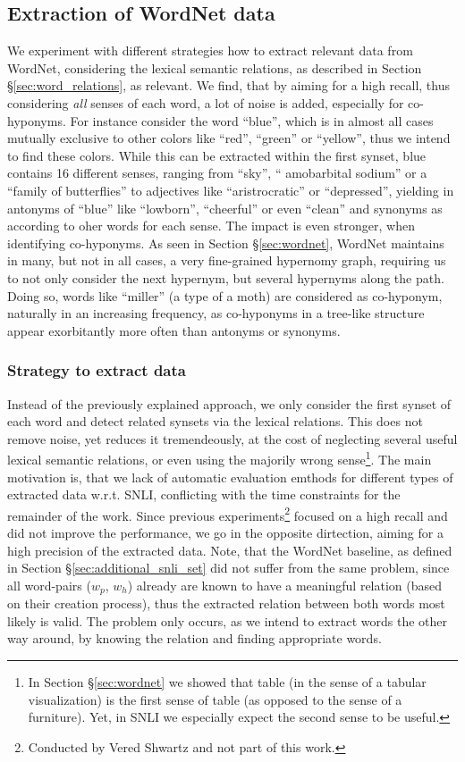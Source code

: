 \subsection{Extraction of WordNet data}
We experiment with different strategies how to extract relevant data from WordNet, considering the lexical semantic relations, as described in Section §\ref{sec:word_relations}, as relevant. We find, that by aiming for a high recall, thus considering \textit{all} senses of each word, a lot of noise is added, especially for co-hyponyms. For instance consider the word ``blue'', which is in almost all cases mutually exclusive to other colors like ``red'', ``green'' or ``yellow'', thus we intend to find these colors. While this can be extracted within the first synset, blue contains 16 different senses, ranging from ``sky'', `` amobarbital sodium'' or a ``family of butterflies'' to adjectives like ``aristrocratic'' or ``depressed'', yielding in antonyms of ``blue'' like  ``lowborn'', ``cheerful'' or even ``clean'' and synonyms as according to oher words for each sense. The impact is even stronger, when identifying co-hyponyms. As seen in Section §\ref{sec:wordnet}, WordNet maintains in many, but not in all cases, a very fine-grained hypernomy graph, requiring us to not only consider the next hypernym, but several hypernyms along the path. Doing so, words like ``miller'' (a type of a moth) are considered as co-hyponym, naturally in an increasing frequency, as co-hyponyms in a tree-like structure appear exorbitantly more often than antonyms or synonyms.

\subsubsection{Strategy to extract data}\label{sec:used_wordnet_extract_strategy}
Instead of the previously explained approach, we only consider the first synset of each word and detect related synsets via the lexical relations. This does not remove noise, yet reduces it tremendeously, at the cost of neglecting several useful lexical semantic relations, or even using the majorily wrong sense\footnote{In Section §\ref{sec:wordnet} we showed that table (in the sense of a tabular visualization) is the first sense of table (as opposed to the sense of a furniture). Yet, in \ac{SNLI} we especially expect the second sense to be useful.}. The main motivation is, that we lack of automatic evaluation emthods for different types of extracted data w.r.t. \ac{SNLI}, conflicting with the time constraints for the remainder of the work. Since previous experiments\footnote{Conducted by Vered Shwartz and not part of this work.} focused on a high recall and did not improve the performance, we go in the opposite dirtection, aiming for a high precision of the extracted data. Note, that the WordNet baseline, as defined in Section §\ref{sec:additional_snli_set} did not suffer from the same problem, since all word-pairs ($w_p$, $w_h$) already are known to have a meaningful relation (based on their creation process), thus the extracted relation between both words most likely is valid. The problem only occurs, as we intend to extract words the other way around, by knowing the relation and finding appropriate words.

